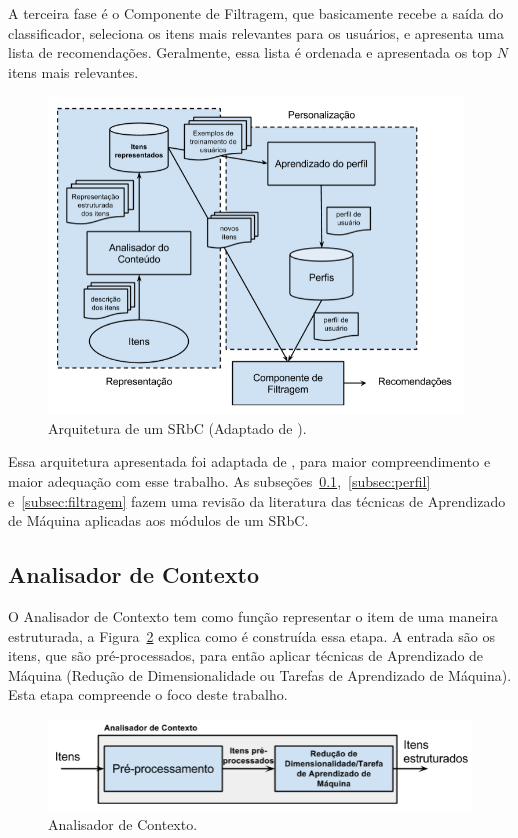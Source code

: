 \documentclass[normaltoc, espacoumemeio, pnumromarab,ruledheader]{abnt}
\begin{document}
A terceira fase é o Componente de Filtragem, que basicamente recebe a saída do classificador, seleciona os itens mais relevantes para os usuários, e apresenta uma lista de recomendações. Geralmente, essa lista é ordenada e apresentada os top $N$ itens mais relevantes.

\begin{figure}[h]
\centering
\includegraphics[width=110mm]{img/approach.png}
\caption{Arquitetura de um SRbC (Adaptado de ).}
\label{fig:approach}
\end{figure}

Essa arquitetura apresentada foi adaptada de \cite{Lops2011}, para maior compreendimento e maior adequação com esse trabalho.
As subseções~\ref{subsec:analisadorcontexto},~\ref{subsec:perfil} e~\ref{subsec:filtragem} fazem uma revisão da literatura das técnicas de Aprendizado de Máquina aplicadas aos módulos de um SRbC. 

\subsection{Analisador de Contexto}
\label{subsec:analisadorcontexto}

O Analisador de Contexto tem como função representar o item de uma maneira estruturada, a Figura~\ref{fig:analisador} explica como é construída essa etapa. A entrada são os itens, que são pré-processados, para então aplicar técnicas de Aprendizado de Máquina (Redução de Dimensionalidade ou Tarefas de Aprendizado de Máquina).
Esta etapa compreende o foco deste trabalho.

\begin{figure}[h]
\centering
\includegraphics[scale=0.6]{img/analisador}
\caption{Analisador de Contexto.}
\label{fig:analisador}
\end{figure}
\end{document}
